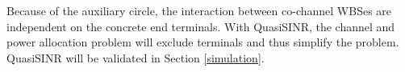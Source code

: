 
Because of the auxiliary circle, 
the interaction between co-channel WBSes are independent on the concrete end terminals. 
With QuasiSINR, the channel and power allocation problem will exclude terminals and thus simplify the problem. 
QuasiSINR will be validated in Section \ref{simulation}. 

